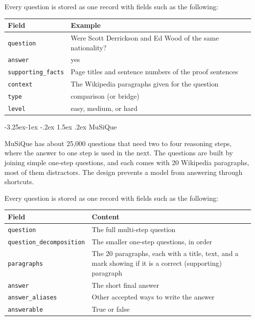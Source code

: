 \documentclass[12pt,a4paper]{report}
\makeatletter
\renewcommand\subsubsection{\@startsection{subsubsection}{3}{\z@}%
    {-3.25ex\@plus -1ex \@minus -.2ex}%
    {1.5ex \@plus .2ex}%
    {\normalfont\fontsize{12}{15}\selectfont\bfseries}}
\makeatother
\begin{document}
Every question is stored as one record with fields such as the following:

\begin{center}
\begin{tabular}{|p{1.4in}|p{4.6in}|}
\hline
\textbf{Field} & \textbf{Example} \\ \hline
\texttt{question} & Were Scott Derrickson and Ed Wood of the same nationality? \\ \hline
\texttt{answer} & yes \\ \hline
\texttt{supporting\_facts} & Page titles and sentence numbers of the proof sentences \\ \hline
\texttt{context} & The Wikipedia paragraphs given for the question \\ \hline
\texttt{type} & comparison (or bridge) \\ \hline
\texttt{level} & easy, medium, or hard \\ \hline
\end{tabular}
\end{center}

\subsubsection{MuSiQue}

MuSiQue \cite{trivedi2022musique} has about 25,000 questions that need two to four reasoning steps, where the answer to one step is used in the next. The questions are built by joining simple one-step questions, and each comes with 20 Wikipedia paragraphs, most of them distractors. The design prevents a model from answering through shortcuts.

Every question is stored as one record with fields such as the following:

\begin{center}
\begin{tabular}{|p{2.2in}|p{3.8in}|}
\hline
\textbf{Field} & \textbf{Content} \\ \hline
\texttt{question} & The full multi-step question \\ \hline
\texttt{question\_\allowbreak decomposition} & The smaller one-step questions, in order \\ \hline
\texttt{paragraphs} & The 20 paragraphs, each with a title, text, and a mark showing if it is a correct (supporting) paragraph \\ \hline
\texttt{answer} & The short final answer \\ \hline
\texttt{answer\_aliases} & Other accepted ways to write the answer \\ \hline
\texttt{answerable} & True or false \\ \hline
\end{tabular}
\end{center}
\end{document}
